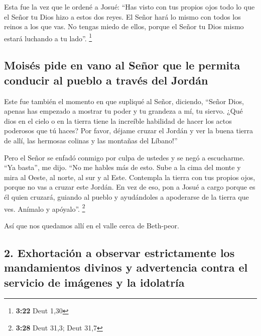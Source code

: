  Esta fue la vez que le ordené a Josué: ``Has visto con
tus propios ojos todo lo que el Señor tu Dios hizo a estos dos reyes. El
Señor hará lo mismo con todos los reinos a los que vas. 
No tengas miedo de ellos, porque el Señor tu Dios mismo estará luchando
a tu lado''. \footnote{\textbf{3:22} Deut 1,30}

\hypertarget{moisuxe9s-pide-en-vano-al-seuxf1or-que-le-permita-conducir-al-pueblo-a-travuxe9s-del-jorduxe1n}{%
\subsection{Moisés pide en vano al Señor que le permita conducir al
pueblo a través del
Jordán}\label{moisuxe9s-pide-en-vano-al-seuxf1or-que-le-permita-conducir-al-pueblo-a-travuxe9s-del-jorduxe1n}}

 Este fue también el momento en que supliqué al Señor,
diciendo,  ``Señor Dios, apenas has empezado a mostrar tu
poder y tu grandeza a mí, tu siervo. ¿Qué dios en el cielo o en la
tierra tiene la increíble habilidad de hacer los actos poderosos que tú
haces?  Por favor, déjame cruzar el Jordán y ver la buena
tierra de allí, las hermosas colinas y las montañas del Líbano!''

 Pero el Señor se enfadó conmigo por culpa de ustedes y
se negó a escucharme. ``Ya basta'', me dijo. ``No me hables más de esto.
 Sube a la cima del monte y mira al Oeste, al norte, al
sur y al Este. Contempla la tierra con tus propios ojos, porque no vas a
cruzar este Jordán.  En vez de eso, pon a Josué a cargo
porque es él quien cruzará, guiando al pueblo y ayudándoles a apoderarse
de la tierra que ves. Anímalo y apóyalo''. \footnote{\textbf{3:28} Deut
  31,3; Deut 31,7}

 Así que nos quedamos allí en el valle cerca de
Beth-peor.

\hypertarget{exhortaciuxf3n-a-observar-estrictamente-los-mandamientos-divinos-y-advertencia-contra-el-servicio-de-imuxe1genes-y-la-idolatruxeda}{%
\subsection{2. Exhortación a observar estrictamente los mandamientos
divinos y advertencia contra el servicio de imágenes y la
idolatría}\label{exhortaciuxf3n-a-observar-estrictamente-los-mandamientos-divinos-y-advertencia-contra-el-servicio-de-imuxe1genes-y-la-idolatruxeda}}

